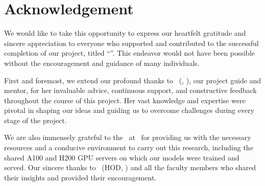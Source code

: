 \chapter*{Acknowledgement}
\thispagestyle{plain}

We would like to take this opportunity to express our heartfelt gratitude and sincere appreciation to everyone who
supported and contributed to the successful completion of our project, titled \enquote{\ReportTitle}. This endeavor
would not have been possible without the encouragement and guidance of many individuals.

First and foremost, we extend our profound thanks to \ReportGuideName\ (\ReportGuideTitle, \ReportDept), our project
guide and mentor, for her invaluable advice, continuous support, and constructive feedback throughout the course of
this project. Her vast knowledge and expertise were pivotal in shaping our ideas and guiding us to overcome challenges
during every stage of the project.

We are also immensely grateful to the \ReportDepartment\ at \ReportInstitution\ for providing us with the necessary
resources and a conducive environment to carry out this research, including the shared A100 and H200 GPU servers on
which our models were trained and served. Our sincere thanks to \ReportHOD\ (HOD, \ReportDept) and all the faculty
members who shared their insights and provided their encouragement.

\vspace{1.5cm}
\newcommand{\Student}[2]{\noindent\MakeUppercase{#1} (Roll No.: #2)\par}
{\raggedleft\itshape \ReportStudents{\Student}\par}
